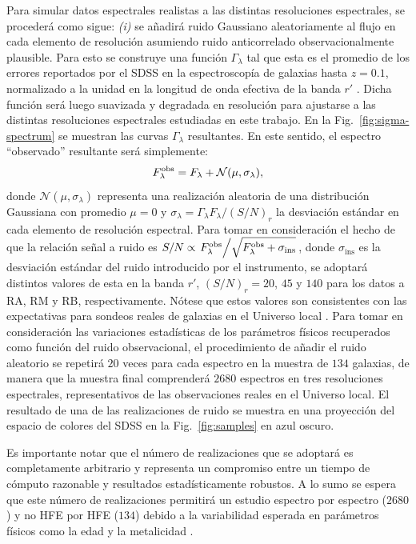 Para simular datos espectrales realistas a las distintas resoluciones espectrales, se procederá como
sigue: \textit{(i)} se añadirá ruido Gaussiano aleatoriamente al flujo en cada elemento de
resolución asumiendo ruido anticorrelado observacionalmente plausible. Para esto se construye una
función $\Gamma_\lambda$ tal que esta es el promedio de los errores reportados por el SDSS en la
espectroscopía de galaxias hasta $z=0.1$, normalizado a la unidad en la longitud de onda efectiva de
la banda $r'$ \citep{Magris2015}. Dicha función será luego suavizada y degradada en resolución para
ajustarse a las distintas resoluciones espectrales estudiadas en este trabajo. En la
Fig.~\ref{fig:sigma-spectrum} se muestran las curvas $\Gamma_\lambda$ resultantes. En este sentido,
el espectro ``observado'' resultante será simplemente:
%
\begin{equation}\label{ec:noise-flux}
\sedt[F]{obs} = {F_\lambda} + \mathcal{N}(\mu,\sigma_\lambda),
\end{equation}
%
donde $\mathcal{N}(\mu,\sigma_\lambda)$ representa una realización aleatoria de una distribución
Gaussiana con promedio $\mu=0$ y $\sigma_\lambda=\Gamma_\lambda F_\lambda/(S/N)_r$ la desviación
estándar en cada elemento de resolución espectral. Para tomar en consideración el hecho de que la
relación señal a ruido es $S/N\propto
\left.\sedt[F]{obs}\middle/\sqrt{\sedt[F]{obs}+\sigma_\text{ins}}\right.$, donde
$\sigma_\text{ins}$ es la desviación estándar del ruido introducido por el instrumento, se adoptará
distintos valores de esta en la banda $r'$, $(S/N)_r=20$, $45$ y $140$ para los datos a RA, RM y RB,
respectivamente. Nótese que estos valores son consistentes con las expectativas para sondeos reales
de galaxias en el Universo local \citep{Benitez2014, Howell2006}. Para tomar en consideración las
variaciones estadísticas de los parámetros físicos recuperados como función del ruido observacional,
el procedimiento de añadir el ruido aleatorio se repetirá $20$ veces para cada espectro en la
muestra de $134$ galaxias, de manera que la muestra final comprenderá $2680$ espectros en tres
resoluciones espectrales, representativos de las observaciones reales en el Universo local. El
resultado de una de las realizaciones de ruido se muestra en una proyección del espacio de colores
del SDSS en la Fig.~\ref{fig:samples} en azul oscuro.

Es importante notar que el número de realizaciones que se adoptará es completamente arbitrario y
representa un compromiso entre un tiempo de cómputo razonable y resultados estadísticamente
robustos. A lo sumo se espera que este número de realizaciones permitirá un estudio espectro por
espectro ($2680$) y no HFE por HFE ($134$) debido a la variabilidad esperada en parámetros físicos
como la edad y la metalicidad \citep[\eg,][]{Magris2015}.

